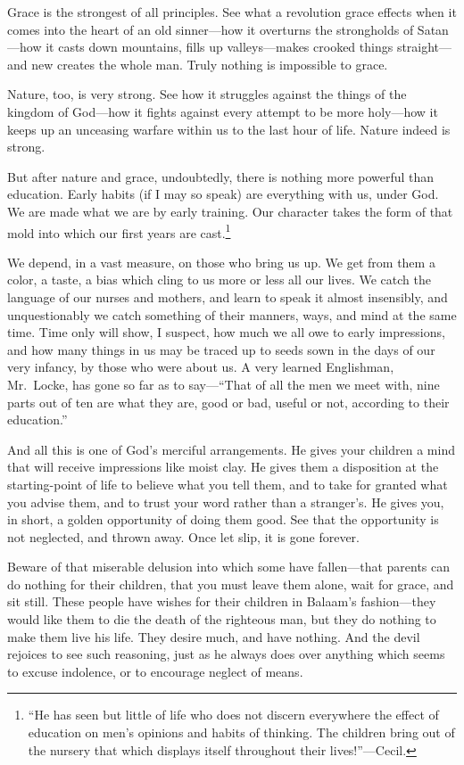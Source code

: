 \documentclass[
]{book}
\begin{document}
Grace is the strongest of all principles. See what a revolution grace effects when it comes into the heart of an old sinner---how it overturns the strongholds of Satan---how it casts down mountains, fills up valleys---makes crooked things straight---and new creates the whole man. Truly nothing is impossible to grace.

Nature, too, is very strong. See how it struggles against the things of the kingdom of God---how it fights against every attempt to be more holy---how it keeps up an unceasing warfare within us to the last hour of life. Nature indeed is strong.

But after nature and grace, undoubtedly, there is nothing more powerful than education. Early habits (if I may so speak) are everything with us, under God. We are made what we are by early training. Our character takes the form of that mold into which our first years are cast.\footnote{``He has seen but little of life who does not discern everywhere the effect of education on men's opinions and habits of thinking. The children bring out of the nursery that which displays itself throughout their lives!''---Cecil.}

We depend, in a vast measure, on those who bring us up. We get from them a color, a taste, a bias which cling to us more or less all our lives. We catch the language of our nurses and mothers, and learn to speak it almost insensibly, and unquestionably we catch something of their manners, ways, and mind at the same time. Time only will show, I suspect, how much we all owe to early impressions, and how many things in us may be traced up to seeds sown in the days of our very infancy, by those who were about us. A very learned Englishman, Mr.~Locke, has gone so far as to say---``That of all the men we meet with, nine parts out of ten are what they are, good or bad, useful or not, according to their education.''

And all this is one of God's merciful arrangements. He gives your children a mind that will receive impressions like moist clay. He gives them a disposition at the starting-point of life to believe what you tell them, and to take for granted what you advise them, and to trust your word rather than a stranger's. He gives you, in short, a golden opportunity of doing them good. See that the opportunity is not neglected, and thrown away. Once let slip, it is gone forever.

Beware of that miserable delusion into which some have fallen---that parents can do nothing for their children, that you must leave them alone, wait for grace, and sit still. These people have wishes for their children in Balaam's fashion---they would like them to die the death of the righteous man, but they do nothing to make them live his life. They desire much, and have nothing. And the devil rejoices to see such reasoning, just as he always does over anything which seems to excuse indolence, or to encourage neglect of means.
\end{document}
